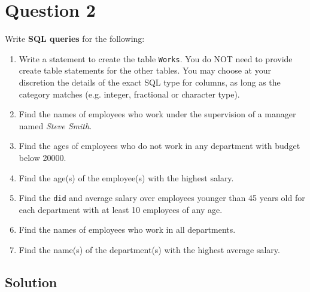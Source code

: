 
\section*{Question 2}

Write \textbf{SQL queries} for the following:

\begin{enumerate}

\item
Write a statement to create the table \texttt{Works}.
You do NOT need to provide create table statements for the other tables.
You may choose at your discretion the details of the exact SQL type for columns, as long as the category matches (e.g. integer, fractional or character type).

\item
Find the names of employees who work under the supervision of a manager named \textit{Steve Smith}.

\item
Find the ages of employees who do not work in any department with budget below 20000.

\item
Find the age(s) of the employee(s) with the highest salary.

\item
Find the \texttt{did} and average salary over employees younger than 45 years old for each department with at least 10 employees of any age.

\item
Find the names of employees who work in all departments.

\item
Find the name(s) of the department(s) with the highest average salary.

\end{enumerate}

\subsection*{Solution}

\lstset{language=sql}

